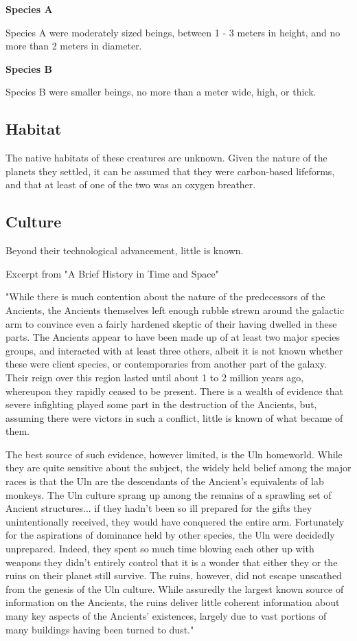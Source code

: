 {\bf Species A}

Species A were moderately sized beings, between 1 - 3 meters in height, and no more than 2 meters in diameter. 

{\bf Species B}

Species B were smaller beings, no more than a meter wide, high, or thick. 


\subsection{Habitat}
The native habitats of these creatures are unknown. Given the nature
of the planets they settled, it can be assumed that they were
carbon-based lifeforms, and that at least of one of the two was an
oxygen breather.

\subsection{Culture}
Beyond their technological advancement, little is known. 

Excerpt from "A Brief History in Time and Space" 

"While there is much contention about the nature of the predecessors
of the Ancients, the Ancients themselves left enough rubble strewn
around the galactic arm to convince even a fairly hardened skeptic of
their having dwelled in these parts. The Ancients appear to have been
made up of at least two major species groups, and interacted with at
least three others, albeit it is not known whether these were client
species, or contemporaries from another part of the galaxy. Their
reign over this region lasted until about 1 to 2 million years ago,
whereupon they rapidly ceased to be present. There is a wealth of
evidence that severe infighting played some part in the destruction of
the Ancients, but, assuming there were victors in such a conflict,
little is known of what became of them.

The best source of such evidence, however limited, is the Uln
homeworld. While they are quite sensitive about the subject, the
widely held belief among the major races is that the Uln are the
descendants of the Ancient's equivalents of lab monkeys. The Uln
culture sprang up among the remains of a sprawling set of Ancient
structures... if they hadn't been so ill prepared for the gifts they
unintentionally received, they would have conquered the entire
arm. Fortunately for the aspirations of dominance held by other
species, the Uln were decidedly unprepared. Indeed, they spent so much
time blowing each other up with weapons they didn't entirely control
that it is a wonder that either they or the ruins on their planet
still survive.  The ruins, however, did not escape unscathed from the
genesis of the Uln culture. While assuredly the largest known source
of information on the Ancients, the ruins deliver little coherent
information about many key aspects of the Ancients' existences,
largely due to vast portions of many buildings having been turned to
dust."

